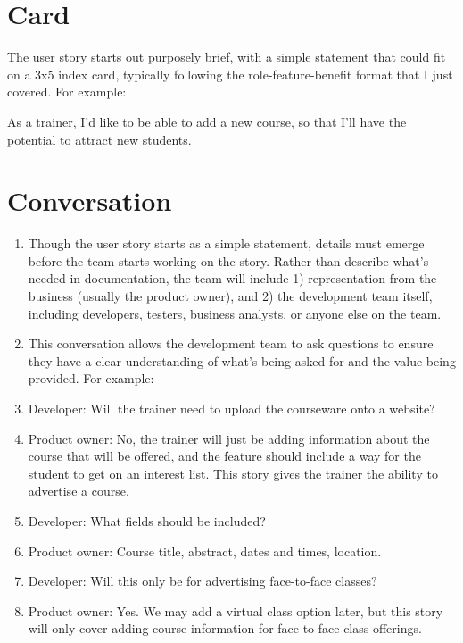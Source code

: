 \section{Card}

The user story starts out purposely brief, with a simple statement that could fit on a 3x5 index card, typically following the role-feature-benefit format that I just covered. For example:

As a trainer, I’d like to be able to add a new course, so that I’ll have the potential to attract new students.

\section{Conversation}
\begin{enumerate}
    \item Though the user story starts as a simple statement, details must emerge before the team starts working on the story. Rather than describe what’s needed in documentation, the team will include 1) representation from the business (usually the product owner), and 2) the development team itself, including developers, testers, business analysts, or anyone else on the team.
    
    \item This conversation allows the development team to ask questions to ensure they have a clear understanding of what’s being asked for and the value being provided. For example:

    \item Developer: Will the trainer need to upload the courseware onto a website?

    \item Product owner: No, the trainer will just be adding information about the course that will be offered, and the feature should include a way for the student to get on an interest list. This story gives the trainer the ability to advertise a course.

    \item Developer: What fields should be included?

    \item Product owner: Course title, abstract, dates and times, location.

    \item Developer: Will this only be for advertising face-to-face classes?

    \item Product owner: Yes. We may add a virtual class option later, but this story will only cover adding course information for face-to-face class offerings.


\end{enumerate}
